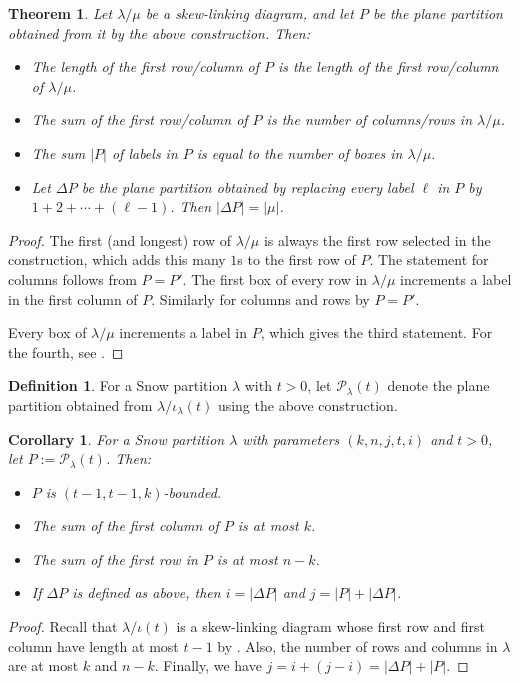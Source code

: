 \documentclass{amsart}
\theoremstyle{plain}
\newtheorem{theorem}{Theorem}[section]
\newtheorem{corollary}[corollary]{Corollary}
\theoremstyle{definition}
\newtheorem{definition}[definition]{Definition}
\numberwithin{equation}{section}
\begin{document}
\begin{theorem}
Let $\lambda/\mu$ be a skew-linking diagram, and let $P$ be the plane partition obtained from it by the above construction. Then:
\begin{itemize}
\item The length of the first row/column of $P$ is the length of the first row/column of $\lambda/\mu$.
\item The sum of the first row/column of $P$ is the number of columns/rows in $\lambda/\mu$.
\item The sum $|P|$ of labels in $P$ is equal to the number of boxes in $\lambda/\mu$.
\item Let $\Delta P$ be the plane partition obtained by replacing every label $\ell$ in $P$ by $1+2+\cdots+(\ell-1)$. Then $|\Delta P|=|\mu|$.
\end{itemize}
\end{theorem}
\begin{proof}
The first (and longest) row of $\lambda/\mu$ is always the first row selected in the construction, which adds this many $1$s to the first row of $P$. The statement for columns follows from $P=P'$. The first box of every row in $\lambda/\mu$ increments a label in the first column of $P$. Similarly for columns and rows by $P=P'$.

Every box of $\lambda/\mu$ increments a label in $P$, which gives the third statement. For the fourth, see \cite[Lemma 2.3.6]{Chen10}.
\end{proof}

\begin{definition}
For a Snow partition $\lambda$ with $t>0$, let $\mathcal{P}_\lambda(t)$ denote the plane partition obtained from $\lambda/\iota_\lambda(t)$ using the above construction.
\end{definition}

\begin{corollary}\label{cor:plane-partition}
For a Snow partition $\lambda$ with parameters $(k,n,j,t,i)$ and $t>0$, let $P:=\mathcal{P}_\lambda(t)$. Then:
\begin{itemize}
\item $P$ is $(t-1,t-1,k)$-bounded.
\item The sum of the first column of $P$ is at most $k$.
\item The sum of the first row in $P$ is at most $n-k$.
\item If $\Delta P$ is defined as above, then $i=|\Delta P|$ and $j=|P|+|\Delta P|$.
\end{itemize}
\end{corollary}
\begin{proof}
Recall that $\lambda/\iota(t)$ is a skew-linking diagram whose first row and first column have length at most $t-1$ by . Also, the number of rows and columns in $\lambda$ are at most $k$ and $n-k$. Finally, we have $j=i+(j-i)=|\Delta P|+|P|$.
\end{proof}
\end{document}
